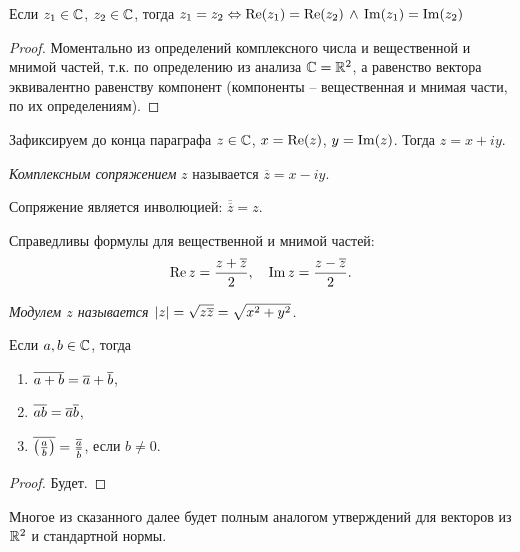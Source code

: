 \begin{proposition}
	Если $z_1 \in \mathbb{C}$, $z_2 \in \mathbb{C}$, тогда $z_1 = z_2 \Leftrightarrow \operatorname{Re}(z_1) = \operatorname{Re}(z_2) \,\land\, \operatorname{Im}(z_1) = \operatorname{Im}(z_2)$
\end{proposition}
\begin{proof}
	Моментально из определений комплексного числа и вещественной и мнимой частей, т.к. по определению из анализа $\mathbb{C} = \mathbb{R}^2$, а равенство вектора эквивалентно равенству компонент (компоненты -- вещественная и мнимая части, по их определениям).
\end{proof}

Зафиксируем до конца параграфа $z \in \mathbb{C}$, $x = \operatorname{Re}(z)$, $y = \operatorname{Im}(z)$. Тогда $z = x + iy$.

\begin{definition}
	\textit{Комплексным сопряжением} $z$ называется $\overline{z} = x - iy$.
\end{definition}
\begin{note}
	Сопряжение является инволюцией: $\overline{\overline{z}} = z$.
\end{note}
\begin{note}
	Справедливы формулы для вещественной и мнимой частей:
	\[
		\operatorname{Re} z = \frac{z + \overline{z}}{2}, \quad \operatorname{Im} z = \frac{z - \overline{z}}{2}.
	\]
\end{note}

\begin{definition}
	\it{Модулем} $z$ называется $\mathopen{}\left\lvert z \right\rvert = \sqrt{z \overline z} = \sqrt{x^2 + y^2}$.
\end{definition}

\begin{proposition}
	Если $a, b \in \mathbb{C}$, тогда
	\begin{enumerate}
		\item $\overline{a + b} = \overline a + \overline b$,
		\item $\overline{ab} = \overline a \overline b$,
		\item $\overline{\mathopen{}\left( \frac{a}{b} \right)\mathclose{}} = \frac{\overline a}{\overline b}$, если $b \neq 0$.
	\end{enumerate}
\end{proposition}
\begin{proof}
	Будет.
\end{proof}

\begin{anote}
	Многое из сказанного далее будет полным аналогом утверждений для векторов из $\mathbb{R}^2$ и стандартной нормы.
\end{anote}

